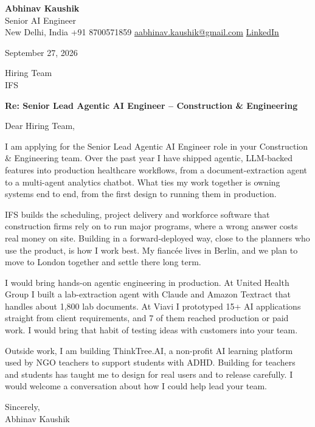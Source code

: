 \documentclass[11pt,a4paper]{article}
\begin{document}
{\Large\bfseries Abhinav Kaushik}\\
Senior AI Engineer\\
New Delhi, India \textbar{} +91 8700571859 \textbar{} \href{mailto:aabhinav.kaushik@gmail.com}{aabhinav.kaushik@gmail.com} \textbar{} \href{https://www.linkedin.com/in/abhinav-kaushik10/}{LinkedIn}  

September 27, 2026

Hiring Team\\
IFS

\textbf{Re: Senior Lead Agentic AI Engineer – Construction \& Engineering}

Dear Hiring Team,

I am applying for the Senior Lead Agentic AI Engineer role in your Construction \& Engineering team. Over the past year I have shipped agentic, LLM-backed features into production healthcare workflows, from a document-extraction agent to a multi-agent analytics chatbot. What ties my work together is owning systems end to end, from the first design to running them in production.

IFS builds the scheduling, project delivery and workforce software that construction firms rely on to run major programs, where a wrong answer costs real money on site. Building in a forward-deployed way, close to the planners who use the product, is how I work best. My fiancée lives in Berlin, and we plan to move to London together and settle there long term.

I would bring hands-on agentic engineering in production. At United Health Group I built a lab-extraction agent with Claude and Amazon Textract that handles about 1,800 lab documents. At Viavi I prototyped 15+ AI applications straight from client requirements, and 7 of them reached production or paid work. I would bring that habit of testing ideas with customers into your team.

Outside work, I am building ThinkTree.AI, a non-profit AI learning platform used by NGO teachers to support students with ADHD. Building for teachers and students has taught me to design for real users and to release carefully. I would welcome a conversation about how I could help lead your team.

Sincerely,\\[4pt]
Abhinav Kaushik
\end{document}
